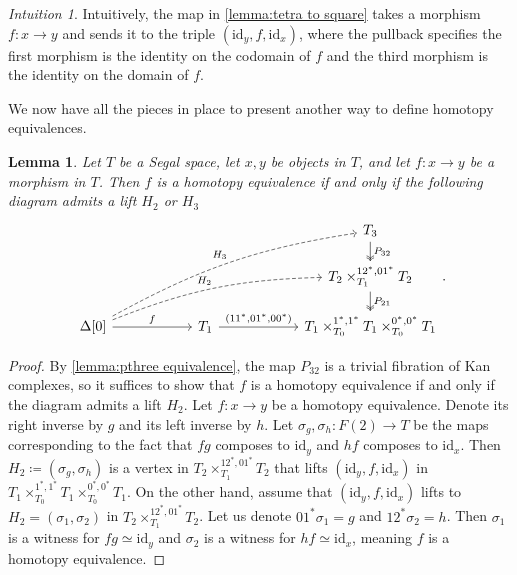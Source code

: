 \documentclass[11pt, a4paper]{amsart}
\newcommand{\id}{\mathrm{id}}
\newtheorem{lemma}[equation]{Lemma}
\theoremstyle{definition}
\theoremstyle{remark}
\newtheorem{intuition}[equation]{Intuition}
\numberwithin{equation}{section}
\begin{document}
\begin{intuition}
  Intuitively, the map in \cref{lemma:tetra to square} takes a morphism $f\colon x \to y$ and sends it to the triple $(\id_y, f, \id_x)$, where the pullback specifies the first morphism is the identity on the codomain of $f$ and the third morphism is the identity on the domain of $f$.
\end{intuition}
 
We now have all the pieces in place to present another way to define homotopy equivalences.

 \begin{lemma} \label{lemma:homotopy equivalence tetrahedron}
  Let $T$ be a Segal space, let $x, y$ be objects in $T$, and let $f\colon x \to y$ be a morphism in $T$. Then $f$ is a homotopy equivalence if and only if the following diagram admits a lift $H_2$ or $H_3$
  \[
  \begin{tikzcd}[column sep= 2cm, row sep=0.5cm]
    & & T_3 \arrow[d, "P_{32}", twoheadrightarrow] \\
    & &  T_2 \times^{12^*,01^*}_{T_1} T_2 \arrow[d, "P_{21}", twoheadrightarrow] \\
    \Delta[0] \arrow[urr, dashed, "H_2", bend left = 10] \arrow[uurr, dashed, "H_3", bend left = 10] \arrow[r, "f"] & T_1 \arrow[r, "{(11^* , 01^* , 00^*)}"] & T_1 \times^{1^*,1^*}_{T_0} T_1 \times^{0^*,0^*}_{T_0} T_1
  \end{tikzcd}.
  \]
 \end{lemma}
 \begin{proof}
  By \cref{lemma:pthree equivalence}, the map $P_{32}$ is a trivial fibration of Kan complexes, so it suffices to show that $f$ is a homotopy equivalence if and only if the diagram admits a lift $H_2$. Let $f\colon x \to y$ be a homotopy equivalence. Denote its right inverse by $g$ and its left inverse by $h$. Let $\sigma_g, \sigma_h\colon F(2) \to T$ be the maps corresponding to the fact that $fg$ composes to $\id_y$ and $hf$ composes to $\id_x$. Then $H_2 \coloneq (\sigma_g, \sigma_h)$ is a vertex in $T_2 \times^{12^*,01^*}_{T_1} T_2$ that lifts $(\id_y ,f ,\id_x)$ in $T_1 \times^{1^*,1^*}_{T_0} T_1 \times^{0^*,0^*}_{T_0} T_1$. On the other hand, assume that $(\id_y ,f ,\id_x)$ lifts to $H_2 = (\sigma_1, \sigma_2)$ in $T_2 \times^{12^*,01^*}_{T_1} T_2$. Let us denote $01^*\sigma_1 = g$ and $12^*\sigma_2 = h$. Then $\sigma_1$ is a witness for $fg \simeq \id_y$ and $\sigma_2$ is a witness for $hf \simeq \id_x$, meaning $f$ is a homotopy equivalence. 
\end{proof}
\end{document}

